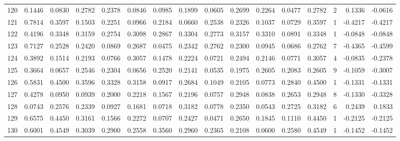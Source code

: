\begin{tabular}{lrrrrrrrrrrrrrrr}
120 &      0.1446 &  0.0830 &  0.2782 &  0.2378 &  0.0846 &  0.0985 &  0.1899 &  0.0605 &  0.2699 &  0.2264 &   0.0477 &     0.2782 &      2 &                    0.1336 &                    -0.0616 \\
121 &      0.7814 &  0.3597 &  0.1503 &  0.2251 &  0.0966 &  0.2184 &  0.0660 &  0.2538 &  0.2326 &  0.1037 &   0.0729 &     0.3597 &      1 &                   -0.4217 &                    -0.4217 \\
122 &      0.4196 &  0.3348 &  0.3159 &  0.2754 &  0.3098 &  0.2867 &  0.3304 &  0.2773 &  0.3157 &  0.3310 &   0.0891 &     0.3348 &      1 &                   -0.0848 &                    -0.0848 \\
123 &      0.7127 &  0.2528 &  0.2420 &  0.0869 &  0.2687 &  0.0475 &  0.2342 &  0.2762 &  0.2300 &  0.0945 &   0.0686 &     0.2762 &      7 &                   -0.4365 &                    -0.4599 \\
124 &      0.3892 &  0.1514 &  0.2193 &  0.0766 &  0.3057 &  0.1478 &  0.2224 &  0.0721 &  0.2494 &  0.2146 &   0.0771 &     0.3057 &      4 &                   -0.0835 &                    -0.2378 \\
125 &      0.3664 &  0.0657 &  0.2546 &  0.2304 &  0.0656 &  0.2520 &  0.2141 &  0.0535 &  0.1975 &  0.2605 &   0.2083 &     0.2605 &      9 &                   -0.1059 &                    -0.3007 \\
126 &      0.5831 &  0.4500 &  0.3596 &  0.3328 &  0.3158 &  0.0917 &  0.2684 &  0.1049 &  0.2105 &  0.0773 &   0.2840 &     0.4500 &      1 &                   -0.1331 &                    -0.1331 \\
127 &      0.4278 &  0.0950 &  0.0939 &  0.2000 &  0.2218 &  0.1567 &  0.2196 &  0.0757 &  0.2948 &  0.0838 &   0.2653 &     0.2948 &      8 &                   -0.1330 &                    -0.3328 \\
128 &      0.0743 &  0.2576 &  0.2339 &  0.0927 &  0.1681 &  0.0718 &  0.3182 &  0.0778 &  0.2350 &  0.0543 &   0.2725 &     0.3182 &      6 &                    0.2439 &                     0.1833 \\
129 &      0.6575 &  0.4450 &  0.3161 &  0.1566 &  0.2272 &  0.0707 &  0.2427 &  0.0471 &  0.2650 &  0.1845 &   0.1110 &     0.4450 &      1 &                   -0.2125 &                    -0.2125 \\
130 &      0.6001 &  0.4549 &  0.3039 &  0.2900 &  0.2558 &  0.3560 &  0.2960 &  0.2365 &  0.2108 &  0.0600 &   0.2580 &     0.4549 &      1 &                   -0.1452 &                    -0.1452 \\

\end{tabular}
